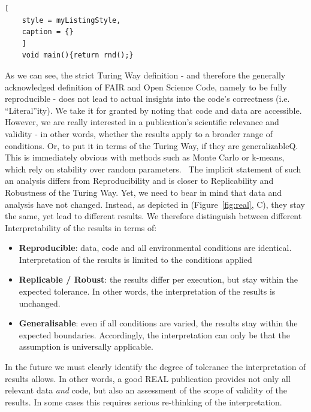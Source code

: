\documentclass{eceasst}
\begin{document}
\begin{lstlisting}[
    style = myListingStyle,
    caption = {}
    ]
    void main(){return rnd();}
\end{lstlisting}

As we can see, the strict Turing Way definition - and therefore the generally acknowledged definition of FAIR and Open Science Code, namely to be fully reproducible - does not lead to actual insights into the code's correctness (i.e. “Literal”ity). We take it for granted by noting that code and data are accessible. However, we are really interested in a publication's scientific relevance and validity - in other words, whether the results apply to a broader range of conditions. Or, to put it in terms of the Turing Way, if they are generalizableQ. This is immediately obvious with methods such as Monte Carlo or k-means, which rely on stability over random parameters.  The implicit statement of such an analysis differs from Reproducibility and is closer to Replicability and Robustness of the Turing Way. Yet, we need to bear in mind that data and analysis have not changed. Instead, as depicted in (Figure~\ref{fig:real}, C), they stay the same, yet lead to different results. We therefore distinguish between different Interpretability of the results in terms of:

\begin{itemize}
    \item \textbf{Reproducible}: data, code and all environmental conditions are identical. Interpretation of the results is limited to the conditions applied
    \item \textbf{Replicable / Robust}: the results differ per execution, but stay within the expected tolerance. In other words, the interpretation of the results is unchanged. 
    \item \textbf{Generalisable}: even if all conditions are varied, the results stay within the expected boundaries. Accordingly, the interpretation can only be that the assumption is universally applicable. 
\end{itemize}

In the future we must clearly identify the degree of tolerance the interpretation of results allows. In other words, a good REAL publication provides not only all relevant data \textit{and} code, but also an assessment of the scope of validity of the results. In some cases this requires serious re-thinking of the interpretation.
\end{document}

